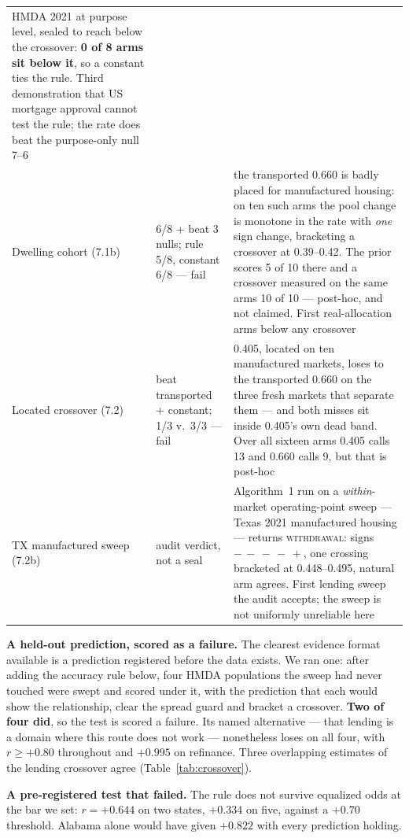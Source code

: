 \documentclass[conference]{IEEEtran}
\begin{document}
\begin{table}[t]
\begin{tabular}{@{}p{2.35cm}p{1.55cm}p{3.6cm}@{}}
HMDA 2021 at purpose level, sealed to reach below the crossover: \textbf{0 of 8 arms sit
below it}, so a constant ties the rule. Third demonstration that US mortgage approval cannot
test the rule; the rate does beat the purpose-only null 7--6 \\
Dwelling cohort (7.1b) & 6/8 + beat 3 nulls; rule 5/8, constant 6/8 --- fail &
the transported 0.660 is badly placed for manufactured housing: on ten such arms the pool
change is monotone in the rate with \emph{one} sign change, bracketing a crossover at
0.39--0.42. The prior scores 5 of 10 there and a crossover measured on the same arms 10 of 10
--- post-hoc, and not claimed. First real-allocation arms below any crossover \\
Located crossover (7.2) & beat transported + constant; 1/3 v.\ 3/3 --- fail &
0.405, located on ten manufactured markets, loses to the transported 0.660 on the three fresh
markets that separate them --- and both misses sit inside 0.405's own dead band. Over all
sixteen arms 0.405 calls 13 and 0.660 calls 9, but that is post-hoc \\
TX manufactured sweep (7.2b) & audit verdict, not a seal & Algorithm~1 run on a
\emph{within}-market operating-point sweep --- Texas 2021 manufactured housing --- returns
\textsc{withdrawal}: signs $-\,-\,-\,-\,+$, one crossing bracketed at 0.448--0.495, natural
arm agrees. First lending sweep the audit accepts; the sweep is not uniformly unreliable here
\\
\bottomrule
\end{tabular}
\end{table}

\textbf{A held-out prediction, scored as a failure.} The clearest evidence format available is
a prediction registered before the data exists. We ran one: after adding the accuracy rule
below, four HMDA populations the sweep had never touched were swept and scored under it, with
the prediction that each would show the relationship, clear the spread guard and bracket a
crossover. \textbf{Two of four did}, so the test is scored a failure. Its named alternative ---
that lending is a domain where this route does not work --- nonetheless loses on all four, with
$r \geq +0.80$ throughout and $+0.995$ on refinance. Three overlapping estimates of the lending
crossover agree (Table~\ref{tab:crossover}).

\textbf{A pre-registered test that failed.} The rule does not survive equalized odds at the bar
we set: $r = +0.644$ on two states, $+0.334$ on five, against a $+0.70$ threshold. Alabama
alone would have given $+0.822$ with every prediction holding.
\end{document}

